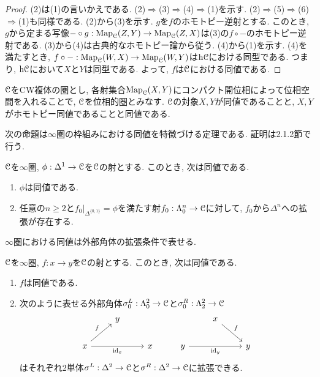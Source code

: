 \documentclass[uplatex, a4paper, 14Q, dvipdfmx]{jsreport}
\begin{document}
\begin{proof}
  (2)は(1)の言いかえである. 
  (2)$\Rightarrow$(3)$\Rightarrow$(4)$\Rightarrow$(1)を示す. 
  (2)$\Rightarrow$(5)$\Rightarrow$(6)$\Rightarrow$(1)も同様である. 
  (2)から(3)を示す. 
  $g$を$f$のホモトピー逆射とする. 
  このとき, $g$から定まる写像$- \circ g : \mathrm{Map}_{\mathcal{C}}(Z,Y) \to \mathrm{Map}_{\mathcal{C}}(Z,X)$は(3)の$f \circ -$のホモトピー逆射である. 
  (3)から(4)は古典的なホモトピー論から従う. 
  (4)から(1)を示す. 
  (4)を満たすとき, $f \circ - : \mathrm{Map}_{\mathcal{C}}(W,X) \to \mathrm{Map}_{\mathcal{C}}(W,Y)$は$\mathrm{h}\mathcal{C}$における同型である. 
  つまり, $\mathrm{h}\mathcal{C}$において$X$と$Y$は同型である. 
  よって, $f$は$\mathcal{C}$における同値である. 
\end{proof}

\begin{example} \label{eg.1.2.4.2}
  $\mathcal{C}$をCW複体の圏とし, 各射集合$\mathrm{Map}_{\mathcal{C}}(X,Y)$にコンパクト開位相によって位相空間を入れることで, $\mathcal{C}$を位相的圏とみなす.
  $\mathcal{C}$の対象$X,Y$が同値であることと, $X,Y$がホモトピー同値であることと同値である.
\end{example}

次の命題は$\infty$圏の枠組みにおける同値を特徴づける定理である. 
証明は2.1.2節で行う. 

\begin{proposition}[Joyal] \label{prop.1.2.4.3}
  $\mathcal{C}$を$\infty$圏, $\phi : \Delta^1 \to \mathcal{C}$を$\mathcal{C}$の射とする. 
  このとき, 次は同値である.
  \begin{enumerate}
    \item $\phi$は同値である. 
    \item 任意の$n \geq 2$と$f_0|_{\Delta^{\{0,1\}}} = \phi$を満たす射$f_0 : \Lambda^n_0 \to \mathcal{C}$に対して, $f_0$から$\Delta^n$への拡張が存在する. 
  \end{enumerate}
\end{proposition}

$\infty$圏における同値は外部角体の拡張条件で表せる. 

\begin{lemma}
  $\mathcal{C}$を$\infty$圏, $f : x \to y$を$\mathcal{C}$の射とする. 
  このとき, 次は同値である. 
  \begin{enumerate}
    \item $f$は同値である. 
    \item 次のように表せる外部角体$\sigma^L_0 : \Lambda^2_0 \to \mathcal{C}$と$\sigma^R_0 : \Lambda^2_2 \to \mathcal{C}$
    \[\begin{tikzcd}
      & y &&& x \\
      x && x & y && y
      \arrow["{\id_x}"', from=2-1, to=2-3]
      \arrow["f", from=2-1, to=1-2]
      \arrow["{\id_y}"', from=2-4, to=2-6]
      \arrow["f", from=1-5, to=2-6]
    \end{tikzcd}\]
    はそれぞれ2単体$\sigma^L : \Delta^2 \to \mathcal{C}$と$\sigma^R : \Delta^2 \to \mathcal{C}$に拡張できる. 
  \end{enumerate}
\end{lemma}
\end{document}
